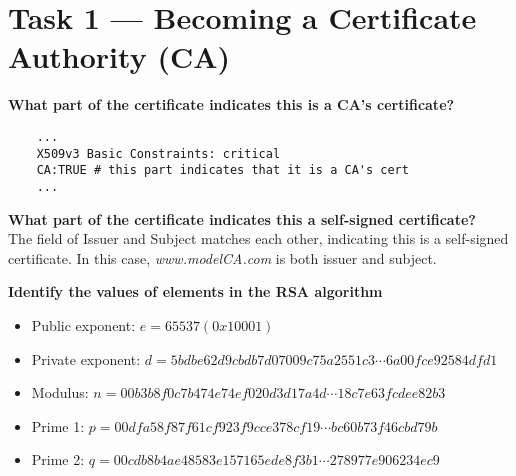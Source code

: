 \section{Task 1 --- Becoming a Certificate Authority (CA)}
%

\textbf{What part of the certificate indicates this is a CA's certificate?}\\
%
\begin{verbatim}
    ...
    X509v3 Basic Constraints: critical
    CA:TRUE # this part indicates that it is a CA's cert
    ...
\end{verbatim}

\textbf{What part of the certificate indicates this a self-signed
certificate?}\\
%
The field of {\selectfont Issuer} and {\selectfont
Subject} matches each other, indicating this is a self-signed certificate.
In this case, \emph{www.modelCA.com} is both issuer and subject.

\textbf{Identify the values of elements in the RSA algorithm}\\
%
\begin{itemize}
    \item Public exponent: \(e = 65537 (0x10001)\)
    \item Private exponent: \(d = 5bdbe62d9cbdb7d07009c75a2551c3 \cdots
    6a00fce92584dfd1\)
    \item Modulus: \(n = 00b3b8f0c7b474e74ef020d3d17a4d \cdots
    18c7e63fcdee82b3\)
    \item Prime 1: \(p = 00dfa58f87f61cf923f9cce378cf19 \cdots
    bc60b73f46cbd79b\)
    \item Prime 2: \(q = 00cdb8b4ae48583e157165ede8f3b1 \cdots
    278977e906234ec9\)
\end{itemize}